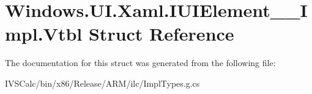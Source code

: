 \hypertarget{struct_windows_1_1_u_i_1_1_xaml_1_1_i_u_i_element_____impl_1_1_vtbl}{}\section{Windows.\+U\+I.\+Xaml.\+I\+U\+I\+Element\+\_\+\+\_\+\+Impl.\+Vtbl Struct Reference}
\label{struct_windows_1_1_u_i_1_1_xaml_1_1_i_u_i_element_____impl_1_1_vtbl}


The documentation for this struct was generated from the following file\+:\begin{DoxyCompactItemize}
\item 
I\+V\+S\+Calc/bin/x86/\+Release/\+A\+R\+M/ilc/Impl\+Types.\+g.\+cs\end{DoxyCompactItemize}
